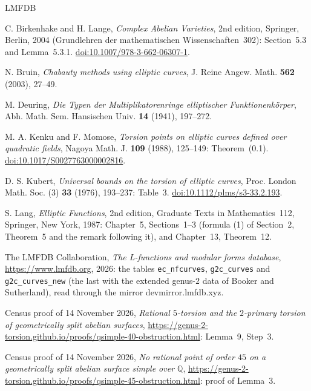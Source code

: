 \documentclass[11pt]{article}
\newcommand{\Q}{\mathbb Q}
\begin{document}
\begin{thebibliography}{LMFDB}

C. Birkenhake and H. Lange, \emph{Complex Abelian Varieties}, 2nd edition, Springer, Berlin, 2004 (Grundlehren der
mathematischen Wissenschaften~302): Section~5.3 and Lemma~5.3.1.
\href{https://doi.org/10.1007/978-3-662-06307-1}{doi:10.1007/978-3-662-06307-1}.

N. Bruin, \emph{Chabauty methods using elliptic curves}, J. Reine Angew. Math. \textbf{562} (2003), 27--49.

M. Deuring, \emph{Die Typen der Multiplikatorenringe elliptischer Funktionenk\"orper}, Abh. Math. Sem. Hansischen
Univ. \textbf{14} (1941), 197--272.

M. A. Kenku and F. Momose, \emph{Torsion points on elliptic curves defined over quadratic fields}, Nagoya Math. J.
\textbf{109} (1988), 125--149: Theorem~(0.1).
\href{https://doi.org/10.1017/S0027763000002816}{doi:10.1017/S0027763000002816}.

D. S. Kubert, \emph{Universal bounds on the torsion of elliptic curves}, Proc. London Math. Soc. (3) \textbf{33}
(1976), 193--237: Table~3.
\href{https://doi.org/10.1112/plms/s3-33.2.193}{doi:10.1112/plms/s3-33.2.193}.

S. Lang, \emph{Elliptic Functions}, 2nd edition, Graduate Texts in Mathematics~112, Springer, New York, 1987:
Chapter~5, Sections~1--3 (formula (1) of Section~2, Theorem~5 and the remark following it), and Chapter~13, Theorem~12.

The LMFDB Collaboration, \emph{The L-functions and modular forms database}, \url{https://www.lmfdb.org}, 2026: the
tables \texttt{ec\_nfcurves}, \texttt{g2c\_curves} and \texttt{g2c\_curves\_new} (the last with the extended genus-\(2\)
data of Booker and Sutherland), read through the mirror devmirror.lmfdb.xyz.

Census proof of 14 November 2026, \emph{Rational \(5\)-torsion and the \(2\)-primary torsion of geometrically split
abelian surfaces}, \url{https://genus-2-torsion.github.io/proofs/qsimple-40-obstruction.html}: Lemma~9, Step~3.

Census proof of 14 November 2026, \emph{No rational point of order \(45\) on a geometrically split abelian surface
simple over \(\Q\)}, \url{https://genus-2-torsion.github.io/proofs/qsimple-45-obstruction.html}: proof of Lemma~3.


\end{thebibliography}
\end{document}
